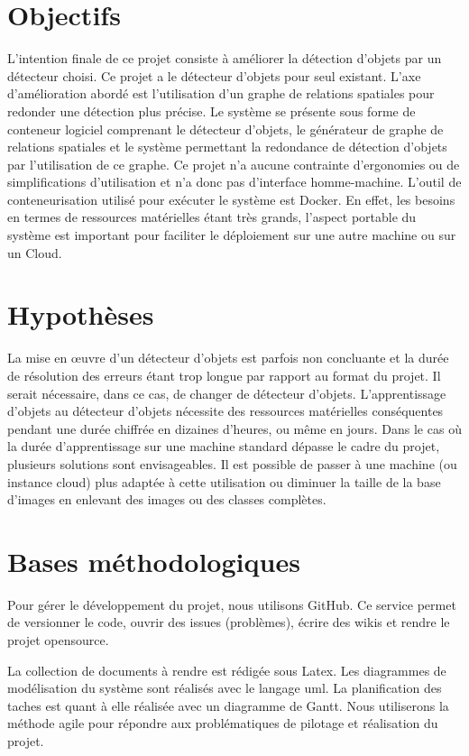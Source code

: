 \documentclass[debug,nodate,hideweeklyreports,noposter]{polytech/polytech}
\begin{document}
\section{Objectifs}

L’intention finale de ce projet consiste à améliorer la détection d’objets par un détecteur choisi. Ce projet a le détecteur d’objets pour seul existant. 
L’axe d’amélioration abordé est l’utilisation d’un graphe de relations spatiales pour redonder une détection plus précise.
Le système se présente sous forme de conteneur logiciel comprenant le détecteur d’objets, le générateur de graphe de relations spatiales et le système permettant la redondance de détection d’objets par l’utilisation de ce graphe.
Ce projet n’a aucune contrainte d’ergonomies ou de simplifications d’utilisation et n’a donc pas d’interface homme-machine.
L’outil de conteneurisation utilisé pour exécuter le système est Docker. En effet, les besoins en termes de ressources matérielles étant très grands, l’aspect portable du système est important pour faciliter le déploiement sur une autre machine ou sur un Cloud.

\section{Hypothèses}

La mise en œuvre d’un détecteur d’objets est parfois non concluante et la durée de résolution des erreurs étant trop longue par rapport au format du projet. Il serait nécessaire, dans ce cas, de changer de détecteur d’objets.
L’apprentissage d’objets au détecteur d’objets nécessite des ressources matérielles conséquentes pendant une durée chiffrée en dizaines d’heures, ou même en jours. Dans le cas où la durée d’apprentissage sur une machine standard dépasse le cadre du projet, plusieurs solutions sont envisageables. Il est possible de passer à une machine (ou instance cloud) plus adaptée à cette utilisation ou diminuer la taille de la base d’images en enlevant des images ou des classes complètes.

\section{Bases méthodologiques}

Pour gérer le développement du projet, nous utilisons GitHub. Ce service permet de versionner le code, ouvrir des issues (problèmes), écrire des wikis et rendre le projet \gls{opensource}.

La collection de documents à rendre est rédigée sous Latex. Les diagrammes de modélisation du système sont réalisés avec le langage \gls{uml}. La planification des taches est quant à elle réalisée avec un diagramme de Gantt. Nous utiliserons la méthode agile pour répondre aux problématiques de pilotage et réalisation du projet. 
\end{document}
